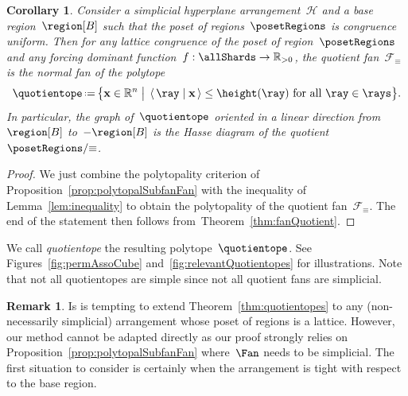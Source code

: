 \documentclass{amsart}
\newtheorem{corollary}[theorem]{Corollary}
\theoremstyle{definition}
\newtheorem{remark}[theorem]{Remark}
\newcommand{\R}{\mathbb{R}} %
\renewcommand{\b}[1]{\mathbf{#1}} %
\newcommand{\bigset}[2]{\big\{ #1 \;\big|\; #2 \big\}} %
\newcommand{\dotprod}[2]{\left\langle \, #1 \; \middle| \; #2 \, \right\rangle} %
\newcommand{\eqdef}{\mbox{\,\raisebox{0.2ex}{\scriptsize\ensuremath{\mathrm:}}\ensuremath{=}\,}} %
\newcommand{\darkblue}{\color{darkblue}} %
\newcommand{\defn}[1]{\textsl{\darkblue #1}} %
\newcommand{\vincent}[1]{\todo[color=blue!30]{#1 \\ \hfill --- V.}}
\newcommand{\arrangement}{\mathcal{H}} %
\newcommand{\fanEquiv}{\mathcal{F}_\equiv} %
\begin{document}
\begin{corollary}
Consider a simplicial hyperplane arrangement~$\arrangement$ and a base region~$\region[B]$ such that the poset of regions~$\posetRegions$ is congruence uniform.
Then for any lattice congruence of the poset of region~$\posetRegions$ and any forcing dominant function~$f : \allShards \to \R_{>0}$, the quotient fan~$\fanEquiv$ is the normal fan of the polytope
\[
\quotientope \eqdef \bigset{\b{x} \in \R^n}{\dotprod{\ray}{\b{x}} \le \height(\ray) \text{ for all } \ray \in \rays}.
\]
In particular, the graph of~$\quotientope$ oriented in a linear direction from~$\region[B]$ to~$-\region[B]$ is the Hasse diagram of the quotient~$\posetRegions/{\equiv}$.
\end{corollary}

\begin{proof}
We just combine the polytopality criterion of Proposition~\ref{prop:polytopalSubfanFan} with the inequality of Lemma~\ref{lem:inequality} to obtain the polytopality of the quotient fan~$\fanEquiv$.
The end of the statement then follows from~Theorem~\ref{thm:fanQuotient}.
\end{proof}

We call \defn{quotientope} the resulting polytope~$\quotientope$.
See Figures~\ref{fig:permAssoCube} and~\ref{fig:relevantQuotientopes} for illustrations.
\vincent{Add illustrations}
Note that not all quotientopes are simple since not all quotient fans are simplicial.

\begin{remark}
Is is tempting to extend Theorem~\ref{thm:quotientopes} to any (non-necessarily simplicial) arrangement whose poset of regions is a lattice.
However, our method cannot be adapted directly as our proof strongly relies on Proposition~\ref{prop:polytopalSubfanFan} where~$\Fan$ needs to be simplicial.
The first situation to consider is certainly when the arrangement is tight with respect to the base region.
\end{remark}
\end{document}
